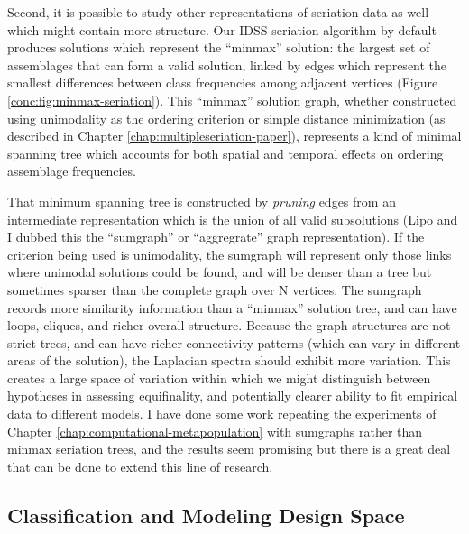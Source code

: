Second, it is possible to study other representations of seriation data as well which might contain more structure.  Our IDSS seriation algorithm \citep{Lipo2015} by default produces solutions which represent the ``minmax'' solution:  the largest set of assemblages that can form a valid solution, linked by edges which represent the smallest differences between class frequencies among adjacent vertices (Figure \ref{conc:fig:minmax-seriation}).  This ``minmax'' solution graph, whether constructed using unimodality as the ordering criterion or simple distance minimization (as described in Chapter \ref{chap:multipleseriation-paper}), represents a kind of minimal spanning tree which accounts for both spatial and temporal effects on ordering assemblage frequencies.  

That minimum spanning tree is constructed by \emph{pruning} edges from an intermediate representation which is the union of all valid subsolutions (Lipo and I dubbed this the ``sumgraph'' or ``aggregrate'' graph representation).  If the criterion being used is unimodality, the sumgraph will represent only those links where unimodal solutions could be found, and will be denser than a tree but sometimes sparser than the complete graph over N vertices.  The sumgraph records more similarity information than a ``minmax'' solution tree, and can have loops, cliques, and richer overall structure.  Because the graph structures are not strict trees, and can have richer connectivity patterns (which can vary in different areas of the solution), the Laplacian spectra should exhibit more variation.  This creates a large space of variation within which we might distinguish between hypotheses in assessing equifinality, and potentially clearer ability to fit empirical data to different models.  I have done some work repeating the experiments of Chapter \ref{chap:computational-metapopulation} with sumgraphs rather than minmax seriation trees, and the results seem promising but there is a great deal that can be done to extend this line of research.  

\subsection{Classification and Modeling Design Space}\label{conc:sec:future-design-space}


